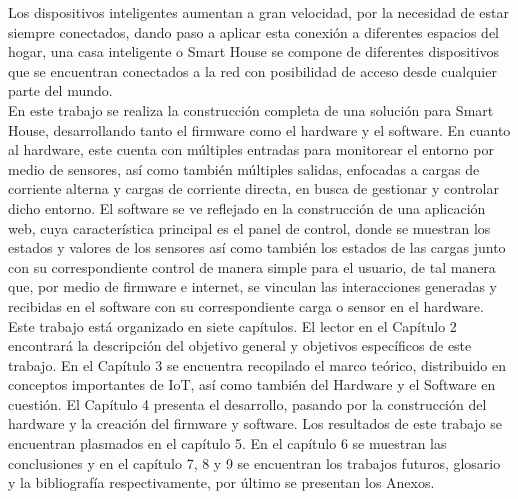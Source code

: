 Los dispositivos inteligentes aumentan a gran velocidad, por la necesidad de estar siempre conectados, dando paso a aplicar esta conexión a diferentes espacios del hogar, una casa inteligente o Smart House se compone de diferentes dispositivos que se encuentran conectados a la red con posibilidad de acceso desde cualquier parte del mundo. \\

En este trabajo se realiza la construcción completa de una solución para Smart House, desarrollando tanto el firmware como el hardware y el software. En cuanto al hardware, este cuenta con múltiples entradas para monitorear el entorno por medio de sensores, así como también múltiples salidas, enfocadas a cargas de corriente alterna y cargas de corriente directa, en busca de gestionar y controlar dicho entorno. El software se ve reflejado en la construcción de una aplicación web, cuya característica principal es el panel de control, donde se muestran los estados y valores de los sensores así como también los estados de las cargas junto con su correspondiente control de manera simple para el usuario, de tal manera que, por medio de firmware e internet, se vinculan las interacciones generadas y recibidas en el software con su correspondiente carga o sensor en el hardware.\\

Este trabajo está organizado en siete capítulos. El lector en el Capítulo 2 encontrará la descripción del objetivo general y objetivos específicos de este trabajo. En el Capítulo 3 se encuentra recopilado el marco teórico, distribuido en conceptos importantes de IoT, así como también del Hardware y el Software en cuestión. El Capítulo 4 presenta el desarrollo, pasando por la construcción del hardware y la creación del firmware y software. Los resultados de este trabajo se encuentran plasmados en el capítulo 5. En el capítulo 6 se muestran las conclusiones y en el capítulo 7, 8 y 9 se encuentran los trabajos futuros, glosario y la bibliografía respectivamente, por último se presentan los Anexos.\\
